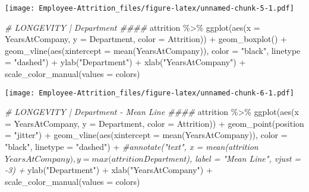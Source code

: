 \documentclass[
]{article}
\newenvironment{Shaded}{\begin{snugshade}}{\end{snugshade}}
\newcommand{\AttributeTok}[1]{\textcolor[rgb]{0.77,0.63,0.00}{#1}}
\newcommand{\CommentTok}[1]{\textcolor[rgb]{0.56,0.35,0.01}{\textit{#1}}}
\newcommand{\FunctionTok}[1]{\textcolor[rgb]{0.00,0.00,0.00}{#1}}
\newcommand{\NormalTok}[1]{#1}
\newcommand{\SpecialCharTok}[1]{\textcolor[rgb]{0.00,0.00,0.00}{#1}}
\newcommand{\StringTok}[1]{\textcolor[rgb]{0.31,0.60,0.02}{#1}}
\begin{document}
\texttt{[image: Employee-Attrition\_files/figure-latex/unnamed-chunk-5-1.pdf]}

\begin{Shaded}
\begin{Highlighting}[]
\CommentTok{\# LONGEVITY | Department \#\#\#\#}
\NormalTok{attrition }\SpecialCharTok{\%\textgreater{}\%} \FunctionTok{ggplot}\NormalTok{(}\FunctionTok{aes}\NormalTok{(}\AttributeTok{x =}\NormalTok{ YearsAtCompany, }\AttributeTok{y =}\NormalTok{ Department, }\AttributeTok{color =}\NormalTok{ Attrition)) }\SpecialCharTok{+}
  \FunctionTok{geom\_boxplot}\NormalTok{() }\SpecialCharTok{+}
  \FunctionTok{geom\_vline}\NormalTok{(}\FunctionTok{aes}\NormalTok{(}\AttributeTok{xintercept =} \FunctionTok{mean}\NormalTok{(YearsAtCompany)), }\AttributeTok{color =} \StringTok{"black"}\NormalTok{, }\AttributeTok{linetype =} \StringTok{"dashed"}\NormalTok{) }\SpecialCharTok{+}
  \FunctionTok{ylab}\NormalTok{(}\StringTok{"Department"}\NormalTok{) }\SpecialCharTok{+}
  \FunctionTok{xlab}\NormalTok{(}\StringTok{"YearsAtCompany"}\NormalTok{) }\SpecialCharTok{+}
  \FunctionTok{scale\_color\_manual}\NormalTok{(}\AttributeTok{values =}\NormalTok{ colors)}
\end{Highlighting}
\end{Shaded}

\texttt{[image: Employee-Attrition\_files/figure-latex/unnamed-chunk-6-1.pdf]}

\begin{Shaded}
\begin{Highlighting}[]
\CommentTok{\# LONGEVITY | Department {-} Mean Line \#\#\#\# }
\NormalTok{attrition }\SpecialCharTok{\%\textgreater{}\%} \FunctionTok{ggplot}\NormalTok{(}\FunctionTok{aes}\NormalTok{(}\AttributeTok{x =}\NormalTok{ YearsAtCompany, }\AttributeTok{y =}\NormalTok{ Department, }\AttributeTok{color =}\NormalTok{ Attrition)) }\SpecialCharTok{+}
  \FunctionTok{geom\_point}\NormalTok{(}\AttributeTok{position =} \StringTok{"jitter"}\NormalTok{) }\SpecialCharTok{+}
  \FunctionTok{geom\_vline}\NormalTok{(}\FunctionTok{aes}\NormalTok{(}\AttributeTok{xintercept =} \FunctionTok{mean}\NormalTok{(YearsAtCompany)), }\AttributeTok{color =} \StringTok{"black"}\NormalTok{, }\AttributeTok{linetype =} \StringTok{"dashed"}\NormalTok{) }\SpecialCharTok{+}
  \CommentTok{\#annotate("text", x = mean(attrition$YearsAtCompany), y = max(attrition$Department), label = "Mean Line", vjust = {-}3) +}
  \FunctionTok{ylab}\NormalTok{(}\StringTok{"Department"}\NormalTok{) }\SpecialCharTok{+}
  \FunctionTok{xlab}\NormalTok{(}\StringTok{"YearsAtCompany"}\NormalTok{) }\SpecialCharTok{+}
  \FunctionTok{scale\_color\_manual}\NormalTok{(}\AttributeTok{values =}\NormalTok{ colors)}
\end{Highlighting}
\end{Shaded}
\end{document}
